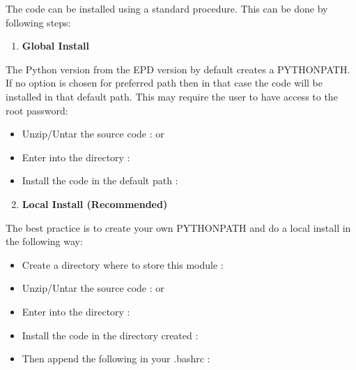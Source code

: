 \documentclass[letterpaper,10pt,english]{sphinxmanual}
\begin{document}
The code can be installed using a standard procedure. This can be done by following steps:
\begin{enumerate}
\item {} 
\textbf{Global Install}

\end{enumerate}

The Python version from the EPD version by default creates a PYTHONPATH. If no option is chosen for preferred path
then in that case the code will be installed in that default path.  This may require the user to have access to the root password:
\begin{itemize}
\item {} 
Unzip/Untar the source code :  or  

\item {} 
Enter into the directory : 

\item {} 
Install the code in the default path : 

\end{itemize}
\begin{enumerate}
\setcounter{enumi}{1}
\item {} 
\textbf{Local Install (Recommended)}

\end{enumerate}

The best practice is to create your own PYTHONPATH and do a local install in the following way:
\begin{itemize}
\item {} 
Create a directory where to store this module : 

\item {} 
Unzip/Untar the source code :   or  

\item {} 
Enter into the directory : 

\item {} 
Install the code in the directory created : 

\item {} 
Then append the following in your .bashrc : 

\end{itemize}
\end{document}
